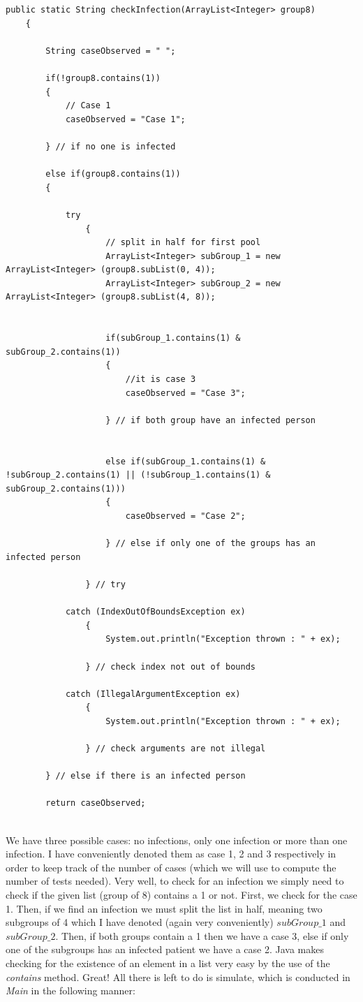 \documentclass[letterpaper, 10pt]{article}
\begin{document}
\begin{lstlisting}
public static String checkInfection(ArrayList<Integer> group8)
    {
    	
    	String caseObserved = " ";

        if(!group8.contains(1))
        {
            // Case 1
        	caseObserved = "Case 1";
            
        } // if no one is infected
        
        else if(group8.contains(1))
        {
        	
        	try 
	        	{
		            // split in half for first pool
		            ArrayList<Integer> subGroup_1 = new ArrayList<Integer> (group8.subList(0, 4));
		            ArrayList<Integer> subGroup_2 = new ArrayList<Integer> (group8.subList(4, 8));
		
		            
		            if(subGroup_1.contains(1) & subGroup_2.contains(1))
		            {
		                //it is case 3
		            	caseObserved = "Case 3";
		                
		            } // if both group have an infected person
		            
		            
		            else if(subGroup_1.contains(1) & !subGroup_2.contains(1) || (!subGroup_1.contains(1) & subGroup_2.contains(1)))
		            {
		            	caseObserved = "Case 2";
		                
		            } // else if only one of the groups has an infected person
		            
	        	} // try 
        	
        	catch (IndexOutOfBoundsException ex) 
	        	{
	                System.out.println("Exception thrown : " + ex);
	                
	            } // check index not out of bounds
	      
	        catch (IllegalArgumentException ex) 
	        	{
	                System.out.println("Exception thrown : " + ex);
	                
	            } // check arguments are not illegal

        } // else if there is an infected person

        return caseObserved;
\end{lstlisting}
\\
We have three possible cases: no infections, only one infection or more than one infection. I have conveniently denoted them as case 1, 2 and 3 respectively in order to keep track of the number of cases (which we will use to compute the number of tests needed). Very well, to check for an infection we simply need to check if the given list (group of 8) contains a 1 or not. First, we check for the case 1. Then, if we find an infection we must split the list in half, meaning two subgroups of 4 which I have denoted (again very conveniently) \textit{$subGroup\_1$} and \textit{$subGroup\_2$}. Then, if both groups contain a 1 then we have a case 3, else if only one of the subgroups has an infected patient we have a case 2. Java makes checking for the existence of an element in a list very easy by the use of the \textit{contains} method. Great! All there is left to do is simulate, which is conducted in \textit{Main} in the following manner:
\end{document}
